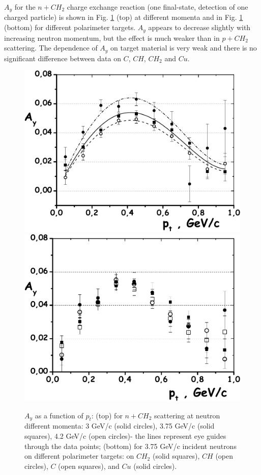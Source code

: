 \documentclass[twocolumn,epjc3]{svjour3}
\begin{document}
$A_y$ for the $n+CH_2$ charge exchange reaction (one final-state, detection of one charged particle) is shown in Fig. \ref{Fig:n+CH2_3_42} (top) at different momenta and in Fig. \ref{Fig:n+CH2_3_42} (bottom) for different polarimeter targets. $A_y$ appears to decrease slightly with increasing neutron momentum, but the effect is much weaker than in $p+CH_2$ scattering. The dependence of $A_y$ on target material is very weak and there is no significant difference between data on $C$, $CH$, $CH_2$ and $Cu$.

\begin{figure}
  \centering
  \includegraphics[width=1.00\columnwidth]{fig18_nCH2_3-42.pdf}
  \hspace*{0.02\columnwidth}
  \includegraphics[width=0.97\columnwidth]{fig18_nAll_375.pdf}
  \caption{$A_y$ as a function of $p_t$: (top) for $n+CH_2$ scattering at neutron different momenta: 3 GeV/c (solid circles), 3.75 GeV/c (solid squares), 4.2 GeV/c (open circles)- the lines represent eye guides through the data points; (bottom) for 3.75 GeV/c incident neutrons on different polarimeter targets: on $CH_2$ (solid squares), $CH$ (open circles), $C$ (open squares), and $Cu$ (solid circles).}
  \label{Fig:n+CH2_3_42}
\end{figure}
\end{document}
